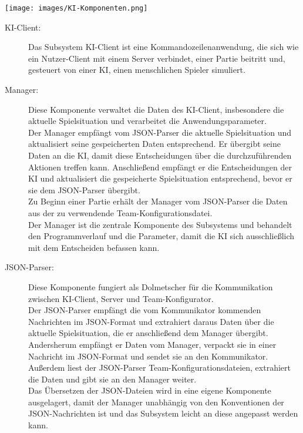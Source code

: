 \begin{center}
	\texttt{[image: images/KI-Komponenten.png]}
\end{center}


\begin{description}
	\item[KI-Client:] 
	Das Subsystem KI-Client ist eine Kommandozeilenanwendung, die sich wie ein Nutzer-Client mit einem Server verbindet, einer Partie beitritt und, gesteuert von einer KI, einen menschlichen Spieler simuliert. 
	\\
	\item[Manager:]
	Diese Komponente verwaltet die Daten des KI-Client, insbesondere die aktuelle Spielsituation und verarbeitet die Anwendungsparameter.\\ Der Manager empfängt vom JSON-Parser die aktuelle Spielsituation und aktualisiert seine gespeicherten Daten entsprechend. Er übergibt seine Daten an die KI, damit diese Entscheidungen über die durchzuführenden Aktionen treffen kann. Anschließend empfängt er die Entscheidungen der KI und aktualisiert die gespeicherte Spielsituation entsprechend, bevor er sie dem JSON-Parser übergibt.\\
	Zu Beginn einer Partie erhält der Manager vom JSON-Parser die Daten aus der zu verwendende Team-Konfigurationsdatei. \\
	Der Manager ist die zentrale Komponente des Subsystems und behandelt den Programmverlauf und die Parameter, damit die KI sich ausschließlich mit dem Entscheiden befassen kann.
	\\
	\item[JSON-Parser:]
	Diese Komponente fungiert als Dolmetscher für die Kommunikation zwischen KI-Client, Server und Team-Konfigurator.\\
	Der JSON-Parser empfängt die vom Kommunikator kommenden Nachrichten im JSON-Format und extrahiert daraus Daten über die aktuelle Spielsituation, die er anschließend dem Manager übergibt. Andersherum empfängt er Daten vom Manager, verpackt sie in einer Nachricht im JSON-Format und sendet sie an den Kommunikator.\\
	Außerdem liest der JSON-Parser Team-Konfigurationsdateien, extrahiert die Daten und gibt sie an den Manager weiter.\\
	Das Übersetzen der JSON-Dateien wird in eine eigene Komponente ausgelagert, damit der Manager unabhängig von den Konventionen der JSON-Nachrichten ist und das Subsystem leicht an diese angepasst werden kann.
	\\

\end{description}
